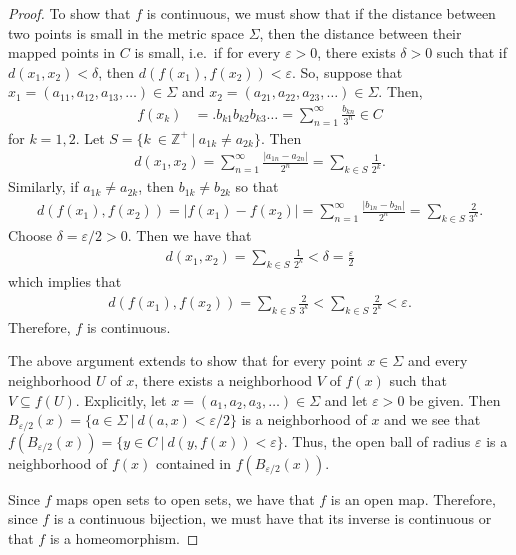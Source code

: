 \begin{proof}
  To show that $f$ is continuous, we must show that if the distance between two points is small
  in the metric space $\Sigma$, then the distance between their mapped points in $C$ is small, i.e.\
  if for every $\varepsilon > 0$, there exists $\delta > 0$ such that if $d(x_1, x_2) < \delta$,
  then $d(f(x_1), f(x_2)) < \varepsilon$.
  So, suppose that $x_1 = (a_{11}, a_{12}, a_{13}, \dots) \in \Sigma$ and $x_2 = (a_{21}, a_{22}, a_{23}, \dots) \in \Sigma$.
  Then,
  \begin{align*}
    f(x_k) &= .b_{k1}b_{k2}b_{k3}\ldots = \sum_{n=1}^\infty \frac{b_{kn}}{3^n} \in C
  \end{align*}
  for $k = 1, 2$. Let $S = \{k\ \in \mathbb{Z}^+ \ |\ a_{1k} \neq a_{2k}\}$. Then
  \begin{align*}
    d(x_1, x_2) = \sum_{n=1}^\infty \frac{|a_{1n} - a_{2n}|}{2^n} = \sum_{k\in S} \frac{1}{2^k}.
  \end{align*}
  Similarly, if $a_{1k} \neq a_{2k}$, then $b_{1k} \neq b_{2k}$ so that
  \begin{align*}
    d(f(x_1), f(x_2)) = |f(x_1) - f(x_2)| = \sum_{n=1}^\infty \frac{|b_{1n} - b_{2n}|}{2^n} = \sum_{k\in S} \frac{2}{3^k}.
  \end{align*}
  Choose $\delta = \varepsilon / 2 > 0$. Then we have that
  \begin{align*}
    d(x_1, x_2) = \sum_{k\in S} \frac{1}{2^k} < \delta = \frac{\varepsilon}{2}
  \end{align*}
  which implies that
  \begin{align*}
    d(f(x_1), f(x_2)) = \sum_{k\in S} \frac{2}{3^k} < \sum_{k\in S} \frac{2}{2^k} < \varepsilon.
  \end{align*}
  Therefore, $f$ is continuous.

  The above argument extends to show that for every point $x \in \Sigma$ and every neighborhood
  $U$ of $x$, there exists a neighborhood $V$ of $f(x)$ such that $V \subseteq f(U)$. Explicitly,
  let $x = (a_1, a_2, a_3, \ldots)\in \Sigma$ and let $\varepsilon > 0$ be given.
  Then $B_{\varepsilon/2}(x) = \{a \in \Sigma \ |\ d(a, x) < \varepsilon/2\}$ is a neighborhood of $x$
  and we see that $f(B_{\varepsilon/2}(x)) = \{y \in C \ |\ d(y, f(x)) < \varepsilon\}$. Thus,
  the open ball of radius $\varepsilon$ is a neighborhood of $f(x)$ contained in $f(B_{\varepsilon/2}(x))$.

  Since $f$ maps open sets to open sets, we have that $f$ is an open map. Therefore, since
  $f$ is a continuous bijection, we must have that its inverse is continuous or that
  $f$ is a homeomorphism.
\end{proof}
\newpage
